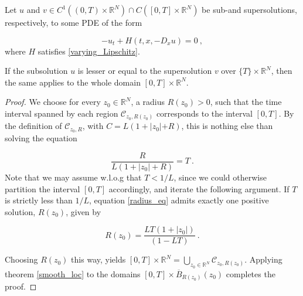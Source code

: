 \begin{corollary}
			\label{Smooth Uniqueness}
			Let $ u $ and $ v \in C^{1}(\left(0, T \right) \times \mathbb{R}^N) \cap C(\left[ 0, T \right] \times \mathbb{R}^{N}) $ be sub-and supersolutions, respectively, to some PDE of the form
			
			\begin{equation*}
				-u_t + H(t, x, -D_x u) = 0 \ ,
			\end{equation*}
			where $ H $ satisfies \eqref{varying_Lipschitz}.
			
			If the subsolution $ u $ is lesser or equal to the supersolution $ v $ over $ \{ T \} \times \mathbb{R}^{N} $, then the same applies to the whole domain $ \left[ 0, T \right] \times \mathbb{R}^{N} $.
			
			\begin{proof}
				We choose for every $ z_0 \in \mathbb{R}^{N} $, a radius $ R(z_0) > 0 $, such that the time interval spanned by each region $ \mathcal{C}_{z_0, R(z_0)} $ corresponds to the interval $ \left[0, T \right] $. By the definition of $ \mathcal{C}_{z_0, R} $, with $ C = L (1 + \lvert z_0 \lvert + R) $, this is nothing else than solving the equation
				
				\begin{equation}
				\label{radius_eq}
					\frac{R}{L(1 + |z_0| + R)} = T \ .
				\end{equation}
				Note that we may assume w.l.o.g that $ T < 1 / L $, since we could otherwise partition the interval $ \left[ 0, T \right] $ accordingly, and iterate the following argument.
				If $ T $ is strictly less than $ 1 / L $, equation \eqref{radius_eq} admits exactly one positive solution, $ R(z_0) $, given by
				
				\begin{equation*}
					R(z_0) = \frac{LT(1 + \lvert z_0 \rvert)}{(1 - LT)} \ .
				\end{equation*}
				
				Choosing $ R(z_0) $ this way, yields $ \left[0, T\right] \times \mathbb{R}^{N} = \bigcup\limits_{z_0 \in \mathbb{R}^{N}} \mathcal{C}_{z_0, R(z_0)} $. Applying theorem \ref{smooth_loc} to the domains $ \left[ 0, T \right] \times \overline{B}_{R(z_0)}(z_0)$ completes the proof.
			\end{proof}
		\end{corollary}